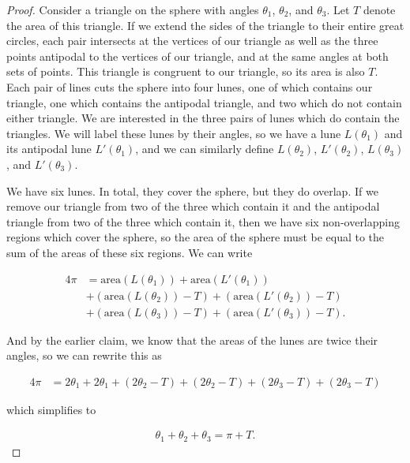 \begin{proof}
	Consider a triangle on the sphere with angles $\theta_1$, $\theta_2$, and $\theta_3$.  Let $T$ denote the area of this triangle. If we extend the sides of the triangle to their entire great circles, each pair intersects at the vertices of our triangle as well as the three points antipodal to the vertices of our triangle, and at the same angles at both sets of points.  This triangle is congruent to our triangle, so its area is also $T$.  Each pair of lines cuts the sphere into four lunes, one of which contains our triangle, one which contains the antipodal triangle, and two which do not contain either triangle.  We are interested in the three pairs of lunes which do contain the triangles.  We will label these lunes by their angles, so we have a lune $L(\theta_1)$ and its antipodal lune $L'(\theta_1)$, and we can similarly define $L(\theta_2)$, $L'(\theta_2)$, $L(\theta_3)$, and $L'(\theta_3)$.
	
	We have six lunes.  In total, they cover the sphere, but they do overlap.  If we remove our triangle from two of the three which contain it and the antipodal triangle from two of the three which contain it, then we have six non-overlapping regions which cover the sphere, so the area of the sphere must be equal to the sum of the areas of these six regions.  We can write
	
	\begin{align*}
	4\pi &= \mathrm{area}(L(\theta_1)) + \mathrm{area}(L'(\theta_1)) \\
	&+  (\mathrm{area}(L(\theta_2)) - T) + (\mathrm{area}(L'(\theta_2)) - T) \\
	&+ (\mathrm{area}(L(\theta_3)) - T)	 + (\mathrm{area}(L'(\theta_3)) - T).
	\end{align*}
	
And by the earlier claim, we know that the areas of the lunes are twice their angles, so we can rewrite this as


	\begin{align*}
4\pi &= 2\theta_1 + 2\theta_1 
+  (2\theta_2 - T) + (2\theta_2-T) 
+ (2\theta_3 - T)	 + (2\theta_3 - T)
\end{align*}

which simplifies to 

	\begin{align*}
\theta_1+\theta_2+\theta_3 = \pi + T.
\end{align*}

\end{proof}

